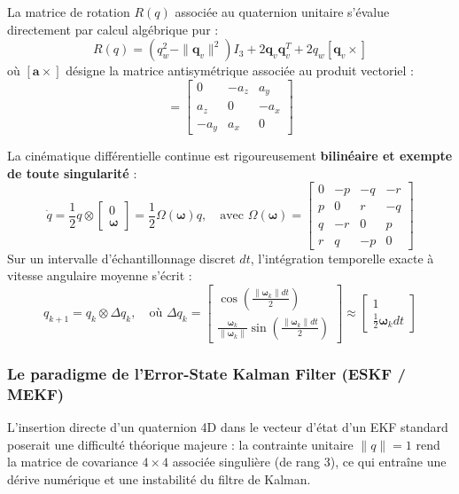\documentclass[../Formulations_Kalman.tex]{subfiles}
\begin{document}
La matrice de rotation $R(q)$ associée au quaternion unitaire s'évalue directement par calcul algébrique pur :
\begin{equation}
R(q) = (q_w^2 - \|\mathbf{q}_v\|^2) I_3 + 2 \mathbf{q}_v \mathbf{q}_v^T + 2 q_w [\mathbf{q}_v \times]
\end{equation}
où $[\mathbf{a}\times]$ désigne la matrice antisymétrique associée au produit vectoriel :
\begin{equation}
[\mathbf{a}\times] = \begin{bmatrix} 0 & -a_z & a_y \\ a_z & 0 & -a_x \\ -a_y & a_x & 0 \end{bmatrix}
\end{equation}

La cinématique différentielle continue est rigoureusement \textbf{bilinéaire et exempte de toute singularité} :
\begin{equation}
\dot{q} = \frac{1}{2} q \otimes \begin{bmatrix} 0 \\ \boldsymbol{\omega} \end{bmatrix} = \frac{1}{2} \Omega(\boldsymbol{\omega}) q, \quad \text{avec } \Omega(\boldsymbol{\omega}) = \begin{bmatrix} 0 & -p & -q & -r \\ p & 0 & r & -q \\ q & -r & 0 & p \\ r & q & -p & 0 \end{bmatrix}
\end{equation}
Sur un intervalle d'échantillonnage discret $dt$, l'intégration temporelle exacte à vitesse angulaire moyenne s'écrit :
\begin{equation}
q_{k+1} = q_k \otimes \Delta q_k, \quad \text{où } \Delta q_k = \begin{bmatrix} \cos\left(\frac{\|\boldsymbol{\omega}_k\| dt}{2}\right) \\ \frac{\boldsymbol{\omega}_k}{\|\boldsymbol{\omega}_k\|} \sin\left(\frac{\|\boldsymbol{\omega}_k\| dt}{2}\right) \end{bmatrix} \approx \begin{bmatrix} 1 \\ \frac{1}{2} \boldsymbol{\omega}_k dt \end{bmatrix}
\end{equation}

\subsubsection{Le paradigme de l'Error-State Kalman Filter (ESKF / MEKF)}
L'insertion directe d'un quaternion 4D dans le vecteur d'état d'un EKF standard poserait une difficulté théorique majeure : la contrainte unitaire $\|q\|=1$ rend la matrice de covariance $4 \times 4$ associée singulière (de rang 3), ce qui entraîne une dérive numérique et une instabilité du filtre de Kalman.
\end{document}
